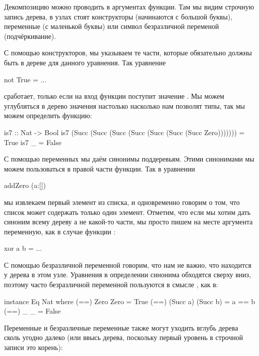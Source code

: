 Декомпозицию можно проводить в аргументах функции. Там мы
видим строчную запись дерева, в узлах стоят конструкторы
(начинаются с большой буквы), переменные (с маленькой буквы)
или символ безразличной переменой (подчёркивание).

С помощью конструкторов, мы указываем те части, которые
обязательно должны быть в дереве для данного уравнения. Так уравнение

\begin{code}
not True   = ...
\end{code}

\noindent сработает, только если на вход функции
поступит значение .
Мы можем углубляться в дерево значения настолько насколько 
нам позволят типы, так мы можем определить функцию:

\begin{code}
is7 :: Nat -> Bool
is7  (Succ (Succ (Succ (Succ (Succ (Succ (Succ Zero)))))))  = True
is7  _                                                      = False
\end{code}

С помощью переменных мы даём синонимы поддеревьям. Этими синонимами
мы можем пользоваться в правой части функции. Так в уравнении 

\begin{code}
addZero (a:[])
\end{code}

\noindent мы извлекаем первый элемент из списка, и одновременно говорим
о том, что список может содержать только один элемент. 
Отметим, что если мы хотим дать синоним всему дереву а не какой-то части,
мы просто пишем на месте аргумента переменную, как в случае функции
:

\begin{code}
xor a b = ...
\end{code}

    
С помощью  безразличной переменной говорим, что нам не важно, что 
находится у дерева в этом узле. Уравнения в определении синонима
обходятся сверху вниз, поэтому часто безразличной переменной
пользуются в смысле , как в:

\begin{code}
instance Eq Nat where
    (==) Zero     Zero     = True
    (==) (Succ a) (Succ b) = a == b
    (==) _        _        = False
\end{code}

Переменные и безразличные переменные также могут уходить
вглубь дерева сколь угодно далеко (или ввысь дерева, поскольку
первый уровень в строчной записи это корень):

